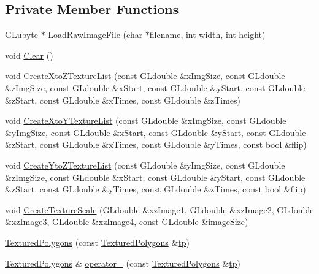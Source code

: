\subsection*{Private Member Functions}
\begin{DoxyCompactItemize}
\item 
G\+Lubyte $\ast$ \hyperlink{class_textured_polygons_af4aa6550dc7c44ef4a9756147df5404e}{Load\+Raw\+Image\+File} (char $\ast$filename, int \hyperlink{main_8cpp_a2474a5474cbff19523a51eb1de01cda4}{width}, int \hyperlink{main_8cpp_ad12fc34ce789bce6c8a05d8a17138534}{height})
\item 
void \hyperlink{class_textured_polygons_ac528f882d17878e9ec11db8c2ab7a1f3}{Clear} ()
\item 
void \hyperlink{class_textured_polygons_afcc97491bf1cbbe22e91bc7e4c476ac3}{Create\+Xto\+Z\+Texture\+List} (const G\+Ldouble \&x\+Img\+Size, const G\+Ldouble \&z\+Img\+Size, const G\+Ldouble \&x\+Start, const G\+Ldouble \&y\+Start, const G\+Ldouble \&z\+Start, const G\+Ldouble \&x\+Times, const G\+Ldouble \&z\+Times)
\item 
void \hyperlink{class_textured_polygons_a037ef33a71ce33954a49b378b3aad197}{Create\+Xto\+Y\+Texture\+List} (const G\+Ldouble \&x\+Img\+Size, const G\+Ldouble \&y\+Img\+Size, const G\+Ldouble \&x\+Start, const G\+Ldouble \&y\+Start, const G\+Ldouble \&z\+Start, const G\+Ldouble \&x\+Times, const G\+Ldouble \&y\+Times, const bool \&flip)
\item 
void \hyperlink{class_textured_polygons_ad5beba21ad65ebbd1c8228924b56e49b}{Create\+Yto\+Z\+Texture\+List} (const G\+Ldouble \&y\+Img\+Size, const G\+Ldouble \&z\+Img\+Size, const G\+Ldouble \&x\+Start, const G\+Ldouble \&y\+Start, const G\+Ldouble \&z\+Start, const G\+Ldouble \&y\+Times, const G\+Ldouble \&z\+Times, const bool \&flip)
\item 
void \hyperlink{class_textured_polygons_adc5387d4097428836d56ea8b3f66e61d}{Create\+Texture\+Scale} (G\+Ldouble \&xz\+Image1, G\+Ldouble \&xz\+Image2, G\+Ldouble \&xz\+Image3, G\+Ldouble \&xz\+Image4, const G\+Ldouble \&image\+Size)
\item 
\hyperlink{class_textured_polygons_a22fb5adddf718bcd26d723069d31679a}{Textured\+Polygons} (const \hyperlink{class_textured_polygons}{Textured\+Polygons} \&\hyperlink{main_8cpp_a6bd63100748332f06fcbd5b3e2d84847}{tp})
\item 
\hyperlink{class_textured_polygons}{Textured\+Polygons} \& \hyperlink{class_textured_polygons_ad3e65ab7a1ca0012b384dbee1675cada}{operator=} (const \hyperlink{class_textured_polygons}{Textured\+Polygons} \&\hyperlink{main_8cpp_a6bd63100748332f06fcbd5b3e2d84847}{tp})
\end{DoxyCompactItemize}
